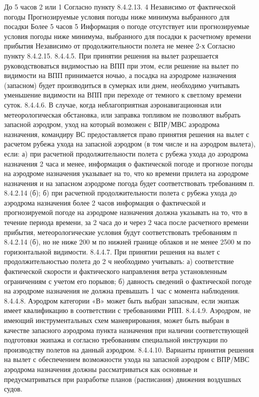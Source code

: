 До 5 часов	2 или 1
Согласно пункту
8.4.2.13.
4	Независимо от фактической погоды	Прогнозируемые условия погоды ниже минимума выбранного 
для посадки	Более 5 часов	
5	Информация о погоде отсутствует или прогнозируемые условия погоды ниже минимума, выбранного для посадки к расчетному времени прибытия	Независимо от продолжительности полета	не менее 2-х
Согласно пункту 8.4.2.15.
8.4.4.5. При принятии решения на вылет разрешается руководствоваться видимостью на ВПП при этом, если решение на вылет по видимости на ВПП принимается ночью, а посадка на аэродроме назначения (запасном) будет производиться в сумерках или днем, необходимо учитывать уменьшение видимости на ВПП при переходе от темного к светлому времени суток.  
8.4.4.6. В случае, когда неблагоприятная аэронавигационная или метеорологическая обстановка, или заправка топливом не позволяют выбрать запасной аэродром, уход на который возможен с ВПР/МВС аэродрома назначения, командиру ВС предоставляется право принятия решения на вылет с расчетом рубежа ухода на запасной аэродром (в том числе и на аэродром вылета), если: 
а)	при расчетной продолжительности полета с рубежа ухода до аэродрома назначения 2 часа и менее, информация о фактической погоде и прогнозе погоды на аэродроме назначения указывает на то, что ко времени прилета на аэродроме назначения и на запасном аэродроме погода будет соответствовать требованиям п. 8.4.2.14 (б); 
б)	при расчетной продолжительности полета с рубежа ухода до аэродрома назначения более 2 часов информация о фактической и прогнозируемой погоде на аэродроме назначения должна указывать на то, что в течение периода времени, за 2 часа до и через 2 часа после расчетного времени прибытия, метеорологические условия будут соответствовать требованиям п 8.4.2.14 (б), но не ниже 200 м по нижней границе облаков и не менее 2500 м по горизонтальной видимости. 
8.4.4.7. При принятии решения на вылет с продолжительностью полета до 2 ч необходимо учитывать: 
а)	соответствие фактической скорости и фактического направления ветра установленным ограничениям с учетом его порывов; 
б)	давность сведений о фактической погоде на аэродроме назначения не должна превышать 1 час с момента наблюдения. 
8.4.4.8. Аэродром категории «В» может быть выбран запасным, если экипаж имеет квалификацию в соответствии с требованиями РПП. 
8.4.4.9. Аэродром, не имеющий инструментальных схем маневрирования, может быть выбран в качестве запасного аэродрома пункта назначения при наличии соответствующей подготовки экипажа и согласно требованиям специальной инструкции по производству полетов на данный аэродром. 
8.4.4.10. Варианты принятия решения на вылет с обеспечением возможности ухода на запасной аэродром с ВПР/МВС аэродрома назначения должны рассматриваться как основные и предусматриваться при разработке планов (расписания) движения воздушных судов. 
